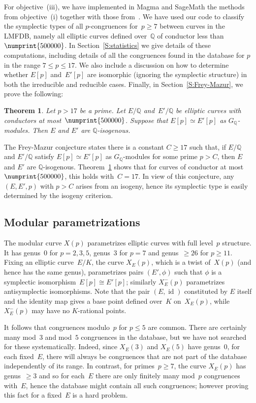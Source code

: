 \documentclass[twoside,leqno,symbols-for-thanks, draft]{rmi}
\numberwithin{equation}{section}
\newcommand{\Sage}{{\sc SageMath}}
\newcommand{\Magma}{{\sc Magma}}
\newcommand{\Q}{\mathbb{Q}}
\DeclareMathOperator{\id}{id}
\newtheorem{theorem}{Theorem}[section]
\theoremstyle{remark}
\begin{document}
For objective~(iii), we have implemented in {\Magma} \cite{magma} and
{\Sage} \cite{sage} the methods from objective~(i) together with those
from~\cite{FKSym}. We have used our code to classify the symplectic
types of all $p$-congruences for~$p\ge7$ between curves in the LMFDB,
namely all elliptic curves defined over~$\Q$ of conductor less
than~$\numprint{500000}$.  In Section~\ref{S:statistics} we give
details of these computations, including details of all the
congruences found in the database for $p$ in the range $7 \leq p \leq
17$.  We also include a discussion on how to determine whether $E[p]$
and~$E'[p]$ are isomorphic (ignoring the symplectic structure) in both
the irreducible and reducible cases. Finally, in
Section~\ref{S:Frey-Mazur}, we prove the following:

\begin{theorem}
 \label{T:cong19}
 Let $p > 17$ be a prime. Let $E/\Q$ and~$E'/\Q$ be elliptic curves
 with conductors at most~$\numprint{500000}$.  Suppose that $E[p]
 \simeq E'[p]$ as $G_\Q$-modules. Then $E$ and $E'$ are
 $\Q$-isogenous.
 \end{theorem}

The Frey-Mazur conjecture states there is a constant $C \geq 17$ such
that, if $E/\Q$ and $E'/\Q$ satisfy $E[p] \simeq E'[p]$ as
$G_\Q$-modules for some prime $p > C$, then $E$ and $E'$ are
$\Q$-isogenous. Theorem~\ref{T:cong19} shows that for curves of
conductor at most~$\numprint{500000}$, this holds with~$C=17$. In view
of this conjecture, any~$(E,E',p)$ with $p > C$ arises from an
isogeny, hence its symplectic type is easily determined by the isogeny
criterion.

\subsection{Modular parametrizations}
The modular curve $X(p)$ parametrizes elliptic curves with full
level~$p$ structure. It has genus~$0$ for $p=2,3,5$, genus~$3$ for
$p=7$ and genus~$\ge26$ for $p\ge11$.  Fixing an elliptic
curve~$E/K$, the curve $X_E(p)$, which is a twist of~$X(p)$ (and
hence has the same genus), parametrizes pairs $(E',\phi)$ such that
$\phi$ is a symplectic isomorphism~$E[p]\cong E'[p]$; similarly
$X_E^-(p)$ parametrizes antisymplectic isomorphisms. Note that the pair $(E,\id)$ constituted by $E$ itself and the identity map
gives a base point defined over~$K$ on~$X_E(p)$, while $X_E^-(p)$ may have no $K$-rational points.

It follows that congruences modulo~$p$ for $p\le 5$ are common.  There
are certainly many mod~$3$ and mod~$5$ congruences in the database,
but we have not searched for these systematically. Indeed, since
$X_E(3)$ and $X_E(5)$ have genus~0, for each fixed~$E$, there will
always be congruences that are not part of the database independently
of its range. In contrast, for primes~$p \geq 7$, the curve $X_E(p)$
has genus~$\geq 3$ and so for each~$E$ there are only finitely many
mod~$p$ congruences with~$E$, hence the database
might contain all such congruences; however proving this fact for a
fixed~$E$ is a hard problem.
\end{document}
